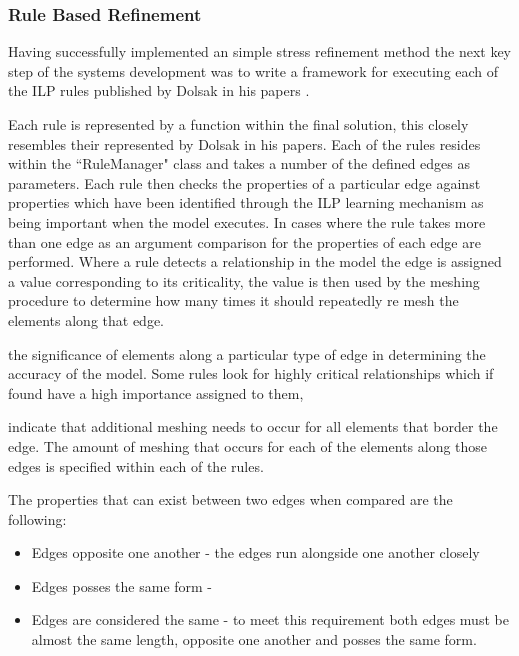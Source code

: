 \documentclass{article}
\begin{document}
\subsubsection{Rule Based Refinement}
Having successfully implemented an simple stress refinement method the next key step of the systems development was to write a framework for executing each of the ILP rules published by Dolsak in his papers \cite{DolsakPaper91, DolsakPaper94, appOfILPToFEMeshDesign} \cite{ConsultRuleIntelltSystemFE}.

Each rule is represented by a function within the final solution, this closely resembles their represented by Dolsak in his papers. Each of the rules resides within the ``RuleManager" class and takes a number of the defined edges as parameters. Each rule then checks the properties of a particular edge against properties which have been identified through the ILP learning mechanism as being important when the model executes. In cases where the rule takes more than one edge as an argument comparison for the properties of each edge are performed. Where a rule detects a relationship in the model the edge is assigned a value corresponding to its criticality, the value is then used by the meshing procedure to determine how many times it should repeatedly re mesh the elements along that edge.


 the significance of elements along a particular type of edge in determining the accuracy of the model. Some rules look for highly critical relationships  which if found have a high importance assigned to them, 

indicate that additional meshing needs to occur for all elements that border the edge. The amount of meshing that occurs for each of the elements along those edges is specified within each of the rules.

The properties that can exist between two edges when compared are the following:

\begin{itemize}
\item Edges opposite one another - the edges run alongside one another closely
\item Edges posses the same form - 

\item Edges are considered the same - to meet this requirement both edges must be almost the same length, opposite one another and posses the same form.

\end{itemize}
\end{document}
